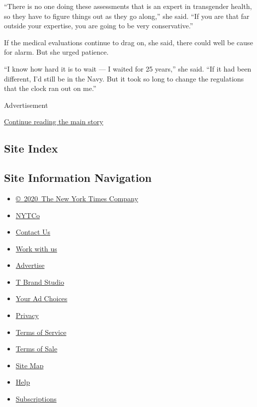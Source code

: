 ``There is no one doing these assessments that is an expert in
transgender health, so they have to figure things out as they go
along,'' she said. ``If you are that far outside your expertise, you are
going to be very conservative.''

If the medical evaluations continue to drag on, she said, there could
well be cause for alarm. But she urged patience.

``I know how hard it is to wait --- I waited for 25 years,'' she said.
``If it had been different, I'd still be in the Navy. But it took so
long to change the regulations that the clock ran out on me.''

Advertisement

\protect\hyperlink{after-bottom}{Continue reading the main story}

\hypertarget{site-index}{%
\subsection{Site Index}\label{site-index}}

\hypertarget{site-information-navigation}{%
\subsection{Site Information
Navigation}\label{site-information-navigation}}

\begin{itemize}
\tightlist
\item
  \href{https://help.nytimes3xbfgragh.onion/hc/en-us/articles/115014792127-Copyright-notice}{©~2020~The
  New York Times Company}
\end{itemize}

\begin{itemize}
\tightlist
\item
  \href{https://www.nytco.com/}{NYTCo}
\item
  \href{https://help.nytimes3xbfgragh.onion/hc/en-us/articles/115015385887-Contact-Us}{Contact
  Us}
\item
  \href{https://www.nytco.com/careers/}{Work with us}
\item
  \href{https://nytmediakit.com/}{Advertise}
\item
  \href{http://www.tbrandstudio.com/}{T Brand Studio}
\item
  \href{https://www.nytimes3xbfgragh.onion/privacy/cookie-policy\#how-do-i-manage-trackers}{Your
  Ad Choices}
\item
  \href{https://www.nytimes3xbfgragh.onion/privacy}{Privacy}
\item
  \href{https://help.nytimes3xbfgragh.onion/hc/en-us/articles/115014893428-Terms-of-service}{Terms
  of Service}
\item
  \href{https://help.nytimes3xbfgragh.onion/hc/en-us/articles/115014893968-Terms-of-sale}{Terms
  of Sale}
\item
  \href{https://spiderbites.nytimes3xbfgragh.onion}{Site Map}
\item
  \href{https://help.nytimes3xbfgragh.onion/hc/en-us}{Help}
\item
  \href{https://www.nytimes3xbfgragh.onion/subscription?campaignId=37WXW}{Subscriptions}
\end{itemize}
